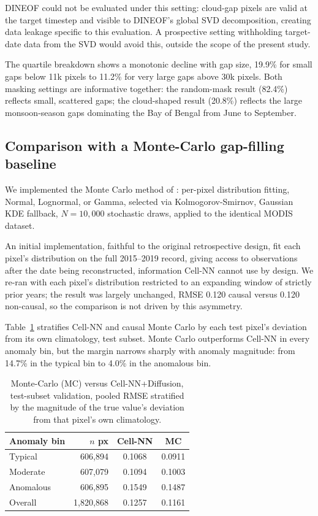 \documentclass[final,5p,times,twocolumn,authoryear]{elsarticle}
\begin{document}
DINEOF could not be evaluated under this setting: cloud-gap pixels
are valid at the target timestep and visible to DINEOF's global SVD
decomposition, creating data leakage specific to this evaluation. A
prospective setting withholding target-date data from the SVD would
avoid this, outside the scope of the present study.

The quartile breakdown shows a monotonic decline with gap size, 19.9\%
for small gaps below 11k pixels to 11.2\% for very large gaps above
30k pixels. Both masking settings are informative together: the
random-mask result (82.4\%) reflects small, scattered gaps; the
cloud-shaped result (20.8\%) reflects the large monsoon-season gaps
dominating the Bay of Bengal from June to September.

\subsection{Comparison with a Monte-Carlo gap-filling baseline}
\label{sec:montecarlo}

We implemented the Monte Carlo method of \citet{modi2022montecarlo}:
per-pixel distribution fitting, Normal, Lognormal, or Gamma, selected
via Kolmogorov-Smirnov, Gaussian KDE fallback, $N=10{,}000$ stochastic
draws, applied to the identical MODIS dataset.

An initial implementation, faithful to the original retrospective
design, fit each pixel's distribution on the full 2015--2019 record,
giving access to observations after the date being reconstructed,
information Cell-NN cannot use by design. We re-ran with each pixel's
distribution restricted to an expanding window of strictly prior
years; the result was largely unchanged, RMSE 0.120 causal versus
0.120 non-causal, so the comparison is not driven by this asymmetry.

Table~\ref{tab:montecarlo} stratifies Cell-NN and causal Monte Carlo
by each test pixel's deviation from its own climatology, test subset.
Monte Carlo outperforms Cell-NN in every anomaly bin, but the margin
narrows sharply with anomaly magnitude: from 14.7\% in the typical
bin to 4.0\% in the anomalous bin.

\begin{table}[t]
\centering
\small
\caption{Monte-Carlo (MC) versus Cell-NN+Diffusion, test-subset
validation, pooled RMSE stratified by the magnitude of the true
value's deviation from that pixel's own climatology.}
\label{tab:montecarlo}
\begin{tabular}{lrcc}
\toprule
Anomaly bin & $n$ px & Cell-NN & MC \\
\midrule
Typical    & 606,894 & 0.1068 & 0.0911 \\
Moderate   & 607,079 & 0.1094 & 0.1003 \\
Anomalous  & 606,895 & 0.1549 & 0.1487 \\
Overall    & 1{,}820{,}868 & 0.1257 & 0.1161 \\
\bottomrule
\end{tabular}
\end{table}
\end{document}
